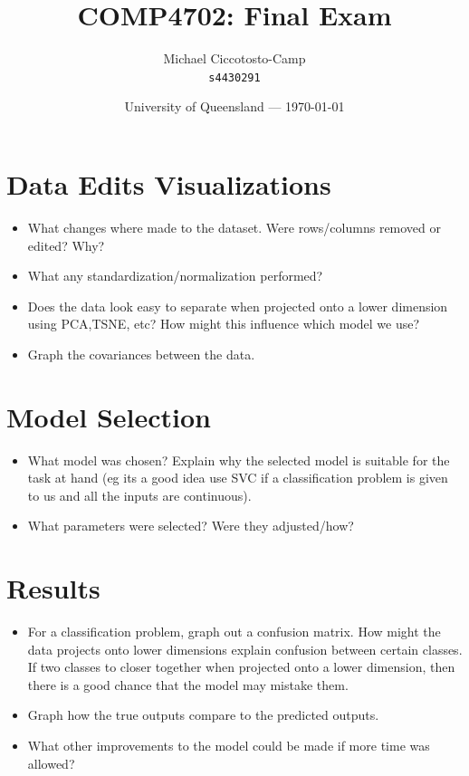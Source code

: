 \documentclass{article}
\title{COMP4702: Final Exam} %
\author{Michael Ciccotosto-Camp\\ \texttt{s4430291}} %
\date{University of Queensland --- \today}
\begin{document}
\maketitle %

\section*{Data Edits Visualizations}

\begin{itemize}
    \item What changes where made to the dataset. Were rows/columns removed or edited? Why?
    \item What any standardization/normalization performed?
    \item Does the data look easy to separate when projected onto a lower dimension using PCA,TSNE, etc? How might this influence which model we use?
    \item Graph the covariances between the data.
\end{itemize}

\section*{Model Selection}

\begin{itemize}
    \item What model was chosen? Explain why the selected model is suitable for the task at hand (eg its a good idea use SVC if a classification problem is given to us and all the inputs are continuous).
    \item What parameters were selected? Were they adjusted/how?
\end{itemize}

\section*{Results}

\begin{itemize}
    \item For a classification problem, graph out a confusion matrix. How might the data projects onto lower dimensions explain confusion between certain classes. If two classes to closer together when projected onto a lower dimension, then there is a good chance that the model may mistake them.
    \item Graph how the true outputs compare to the predicted outputs.
    \item What other improvements to the model could be made if more time was allowed?
\end{itemize}
\end{document}
